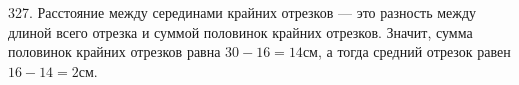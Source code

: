 327. Расстояние между серединами крайних отрезков --- это разность между длиной всего отрезка и суммой половинок крайних отрезков. Значит, сумма половинок крайних отрезков равна $30-16=14$см, а тогда средний отрезок равен $16-14=2$см.\\
